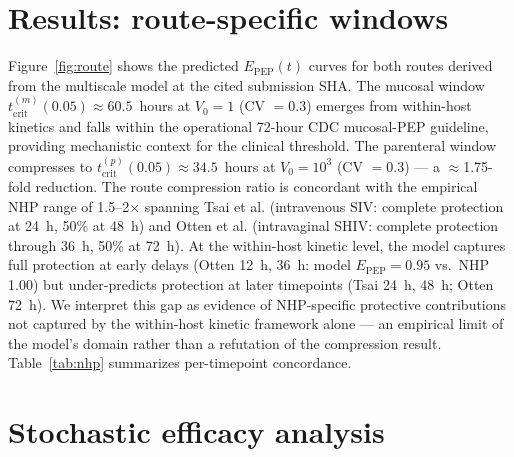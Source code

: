 \documentclass[11pt]{article}
\theoremstyle{definition}
\theoremstyle{remark}
\newcommand{\Epep}{E_{\text{PEP}}}
\newcommand{\tcrit}{t_{\text{crit}}}
\begin{document}
\section*{Results: route-specific windows}

Figure~\ref{fig:route} shows the predicted $\Epep(t)$ curves for both routes derived from the multiscale model at the cited submission SHA. The mucosal window $\tcrit^{(m)}(0.05) \approx 60.5$~hours at $V_{0} = 1$ (CV $= 0.3$) emerges from within-host kinetics and falls within the operational 72-hour CDC mucosal-PEP guideline\cite{tanner2025}, providing mechanistic context for the clinical threshold. The parenteral window compresses to $\tcrit^{(p)}(0.05) \approx 34.5$~hours at $V_{0} = 10^{3}$ (CV $= 0.3$) --- a $\approx$1.75-fold reduction. The route compression ratio is concordant with the empirical NHP range of 1.5--2$\times$ spanning Tsai et al.\cite{tsai1995} (intravenous SIV: complete protection at 24~h, 50\% at 48~h) and Otten et al.\cite{otten2000} (intravaginal SHIV: complete protection through 36~h, 50\% at 72~h). At the within-host kinetic level, the model captures full protection at early delays (Otten 12~h, 36~h: model $\Epep = 0.95$ vs.\ NHP 1.00) but under-predicts protection at later timepoints (Tsai 24~h, 48~h; Otten 72~h). We interpret this gap as evidence of NHP-specific protective contributions not captured by the within-host kinetic framework alone --- an empirical limit of the model's domain rather than a refutation of the compression result. Table~\ref{tab:nhp} summarizes per-timepoint concordance.

\section*{Stochastic efficacy analysis}
\end{document}
